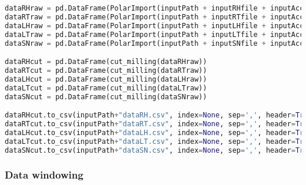 \begin{lstlisting}[language=Python]
dataRHraw = pd.DataFrame(PolarImport(inputPath + inputRHfile + inputAccFix, "Acc"), columns=["AX", "AY", "AZ", "AT"])
dataRTraw = pd.DataFrame(PolarImport(inputPath + inputRTfile + inputAccFix, "Acc"), columns=["AX", "AY", "AZ", "AT"])
dataLHraw = pd.DataFrame(PolarImport(inputPath + inputLHfile + inputAccFix, "Acc"), columns=["AX", "AY", "AZ", "AT"])           
dataLTraw = pd.DataFrame(PolarImport(inputPath + inputLTfile + inputAccFix, "Acc"), columns=["AX", "AY", "AZ", "AT"])
dataSNraw = pd.DataFrame(PolarImport(inputPath + inputSNfile + inputAccFix, "Acc"), columns=["AX", "AY", "AZ", "AT"])

dataRHcut = pd.DataFrame(cut_milling(dataRHraw))
dataRTcut = pd.DataFrame(cut_milling(dataRTraw))
dataLHcut = pd.DataFrame(cut_milling(dataLHraw))  
dataLTcut = pd.DataFrame(cut_milling(dataLTraw))
dataSNcut = pd.DataFrame(cut_milling(dataSNraw))

dataRHcut.to_csv(inputPath+"dataRH.csv", index=None, sep=',', header=True)
dataRTcut.to_csv(inputPath+"dataRT.csv", index=None, sep=',', header=True)
dataLHcut.to_csv(inputPath+"dataLH.csv", index=None, sep=',', header=True)
dataLTcut.to_csv(inputPath+"dataLT.csv", index=None, sep=',', header=True)
dataSNcut.to_csv(inputPath+"dataSN.csv", index=None, sep=',', header=True)
\end{lstlisting}
\clearpage

\subsubsection{Data windowing}


